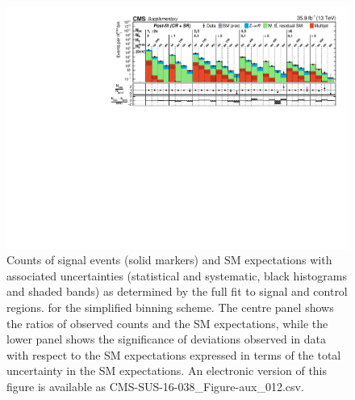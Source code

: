 \begin{figure}[h!]
  \centering
  \includegraphics[width=0.95\linewidth]{Supplementary/CMS-SUS-16-038_Figure-aux_012} 
  \caption{Counts of signal events (solid markers) and SM expectations
    with associated uncertainties (statistical and systematic, black
    histograms and shaded bands) 
    as determined by the full fit to signal and control regions.
    for the simplified binning scheme.
    The centre panel shows the ratios of
    observed counts and the SM expectations, while the lower panel
    shows the significance of deviations observed in data with respect
    to the SM expectations expressed in terms of the total uncertainty
    in the SM expectations.
    An electronic version of this figure is available as CMS-SUS-16-038\_Figure-aux\_012.csv.
    }
  \label{fig:aggregated_results_full-fit}
\end{figure}

